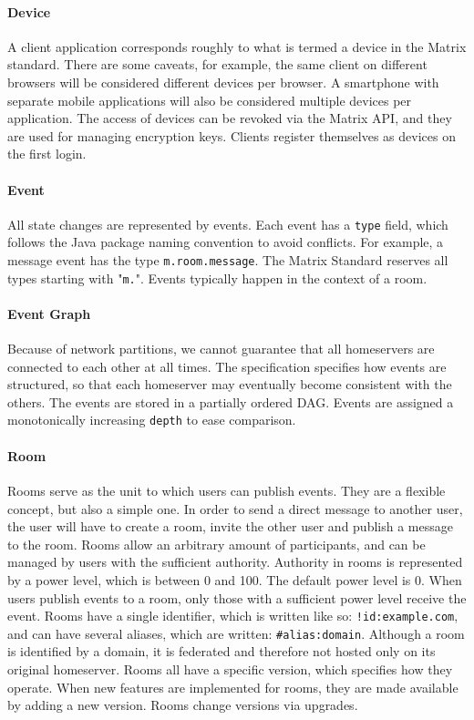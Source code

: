 \paragraph{Device}
A client application corresponds roughly to what is termed a device in the Matrix standard.
There are some caveats, for example, the same client on different browsers will be considered different devices per browser.
A smartphone with separate mobile applications will also be considered multiple devices per application.
The access of devices can be revoked via the Matrix \ac{API}, and they are used for managing encryption keys.
Clients register themselves as devices on the first login.

\paragraph{Event}
All state changes are represented by events.
Each event has a \texttt{type} field, which follows the Java package naming convention to avoid conflicts.
For example, a message event has the type \texttt{m.room.message}.
The Matrix Standard reserves all types starting with "\texttt{m.}".
Events typically happen in the context of a room.

\paragraph{Event Graph}
Because of network partitions, we cannot guarantee that all homeservers are connected to each other at all times.
The specification specifies how events are structured, so that each homeserver may eventually become consistent with the others.
The events are stored in a partially ordered \ac{DAG}.
Events are assigned a monotonically increasing \texttt{depth} to ease comparison.

\paragraph{Room}
Rooms serve as the unit to which users can publish events.
They are a flexible concept, but also a simple one.
In order to send a direct message to another user, the user will have to create a room, invite the other user and publish a message to the room.
Rooms allow an arbitrary amount of participants, and can be managed by users with the sufficient authority.
Authority in rooms is represented by a power level, which is between 0 and 100.
The default power level is 0.
When users publish events to a room, only those with a sufficient power level receive the event.
Rooms have a single identifier, which is written like so: \texttt{!id:example.com}, and can have several aliases, which are written: \texttt{\#alias:domain}.
Although a room is identified by a domain, it is federated and therefore not hosted only on its original homeserver.
Rooms all have a specific version, which specifies how they operate.
When new features are implemented for rooms, they are made available by adding a new version.
Rooms change versions via upgrades.

